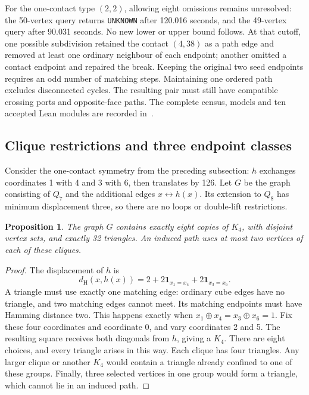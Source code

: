 \documentclass[11pt,a4paper]{article}
\newtheorem{proposition}[theorem]{Proposition}
\theoremstyle{definition}
\theoremstyle{remark}
\newcommand{\Ham}{d_{\mathrm H}}
\begin{document}
For the one-contact type $(2,2)$, allowing eight omissions remains
unresolved: the 50-vertex query returns \texttt{UNKNOWN} after
120.016 seconds, and the 49-vertex query after 90.031 seconds.
No new lower or upper bound follows.
At that cutoff, one possible subdivision retained the contact $(4,38)$
as a path edge and removed at least one ordinary neighbour of each
endpoint; another omitted a contact endpoint and repaired the break.
Keeping the original two seed endpoints requires an odd number of
matching steps. Maintaining one ordered path excludes disconnected cycles.
The resulting pair must still have compatible crossing ports and
opposite-face paths. The complete census, models and ten accepted
Lean modules are recorded in~\cite{symmetry197archive}.


\subsection{Clique restrictions and three endpoint classes}
\label{sec:symmetry198}

Consider the one-contact symmetry from the preceding subsection:
$h$ exchanges coordinates 1 with 4 and 3 with 6, then translates by 126.
Let $G$ be the graph consisting of $Q_7$ and the additional edges
$x\leftrightarrow h(x)$. Its extension to $Q_8$ has minimum displacement
three, so there are no loops or double-lift restrictions.

\begin{proposition}
The graph $G$ contains exactly eight copies of $K_4$, with disjoint
vertex sets, and exactly 32 triangles. An induced path uses at most
two vertices of each of these cliques.
\end{proposition}
\begin{proof}
The displacement of $h$ is
\[
\Ham(x,h(x))=2+2\mathbf1_{x_1=x_4}+2\mathbf1_{x_3=x_6}.
\]
A triangle must use exactly one matching edge: ordinary cube edges
have no triangle, and two matching edges cannot meet. Its matching
endpoints must have Hamming distance two. This happens exactly when
$x_1\oplus x_4=x_3\oplus x_6=1$.
Fix these four coordinates and coordinate 0, and vary coordinates 2 and 5.
The resulting square receives both diagonals from $h$, giving a $K_4$.
There are eight choices, and every triangle arises in this way. Each
clique has four triangles. Any larger clique or another $K_4$ would
contain a triangle already confined to one of these groups. Finally,
three selected vertices in one group would form a triangle, which
cannot lie in an induced path.
\end{proof}
\end{document}
